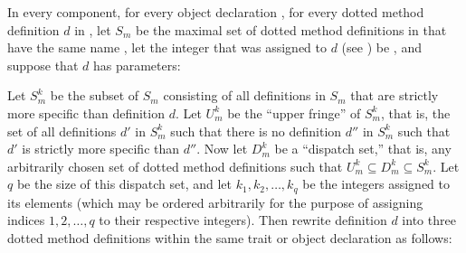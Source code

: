 In every component, for every object declaration ,
for every dotted method definition $d$ in ,
let $S_m$ be the maximal set of dotted method definitions in 
that have the same name ,
let the integer that was assigned to $d$  (see ) be ,
and suppose that $d$ has  parameters:
\begin{codeexamplesize}
\begin{tabbing}
\end{tabbing}
\end{codeexamplesize}
Let $S_m^k$ be the subset of $S_m$ consisting of all definitions in $S_m$ that
are strictly more specific than definition $d$.  Let $U_m^k$ be the ``upper fringe'' of $S_m^k$,
that is, the set of all definitions $d'$ in $S_m^k$ such that there is no definition $d''$
in $S_m^k$ such that $d'$ is strictly more specific than $d''$.  Now let $D_m^k$ be a ``dispatch set,''
that is, any arbitrarily chosen set of dotted method definitions such that $U_m^k \subseteq D_m^k \subseteq S_m^k$.
Let $q$ be the size of this
dispatch set, and let $k_1, k_2, \ldots, k_q$ be the integers assigned to its elements (which may be ordered
arbitrarily for the purpose of assigning indices $1, 2, \ldots, q$ to their respective integers).
Then rewrite definition $d$ into three dotted method definitions within the same trait or object declaration as follows:
